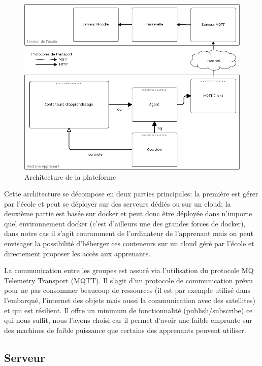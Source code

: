 \documentclass[a4paper,11pt]{report}
\begin{document}
\begin{figure}[h]
   \caption{\label{architecture} Architecture de la plateforme}
   \includegraphics[width=\textwidth, keepaspectratio=true]{architecture.png}
\end{figure}

Cette architecture se décompose en deux parties principales: la première est gérer par l'école et peut se déployer sur des serveurs dédiés ou sur un cloud; la deuxième partie est basée sur docker et peut donc être déployée dans n'importe quel environnement docker (c'est d'ailleurs une des grandes forces de docker), dans notre cas il s'agit couramment de l'ordinateur de l'apprenant mais on peut envisager la possibilité d'héberger ces conteneurs sur un cloud géré par l'école et directement proposer les accès aux apprenants.

La communication entre les groupes est assuré via l'utilisation du protocole MQ Telemetry Transport (MQTT). Il s'agit d'un protocole de communication prévu pour ne pas consommer beaucoup de ressources (il est par exemple utilisé dans l'embarqué, l'internet des objets mais aussi la communication avec des satellites) et qui est résilient. Il offre un minimum de fonctionnalité (publish/subscribe) ce qui nous suffit, nous l'avons choisi car il permet d'avoir une faible emprunte sur des machines de faible puissance que certains des apprenants peuvent utiliser.

\subsection{Serveur}
\end{document}
